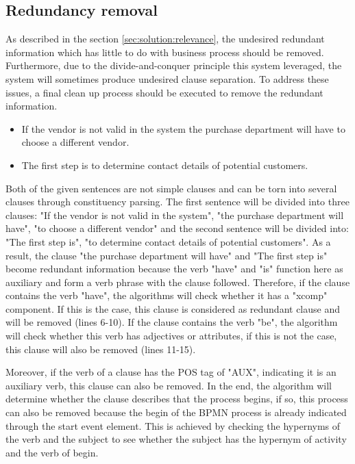 \subsection{Redundancy removal}
As described in the section \ref{sec:solution:relevance}, the undesired redundant information which has little to do with business process should be removed. Furthermore, due to the divide-and-conquer principle this system leveraged, the system will sometimes produce undesired clause separation. To address these issues, a final clean up process should be executed to remove the redundant information. 

\begin{itemize}
    \item If the vendor is not valid in the system the purchase department will have to choose a different vendor.
    \item The first step is to determine contact details of potential customers.
\end{itemize}

Both of the given sentences are not simple clauses and can be torn into several clauses through constituency parsing. The first sentence will be divided into three clauses: "If the vendor is not valid in the system", "the purchase department will have", "to choose a different vendor" and the second sentence will be divided into: "The first step is", "to determine contact details of potential customers". As a result, the clause "the purchase department will have" and "The first step is" become redundant information because the verb "have" and "is" function here as auxiliary and form a verb phrase with the clause followed. Therefore, if the clause contains the verb "have", the algorithms will check whether it has a "xcomp" component. If this is the case, this clause is considered as redundant clause and will be removed (lines 6-10). If the clause contains the verb "be", the algorithm will check whether this verb has adjectives or attributes, if this is not the case, this clause will also be removed (lines 11-15).

Moreover, if the verb of a clause has the POS tag of "AUX", indicating it is an auxiliary verb, this clause can also be removed. In the end, the algorithm will determine whether the clause describes that the process begins, if so, this process can also be removed because the begin of the BPMN process is already indicated through the start event element. This is achieved by checking the hypernyms of the verb and the subject to see whether the subject has the hypernym of activity and the verb of begin.

